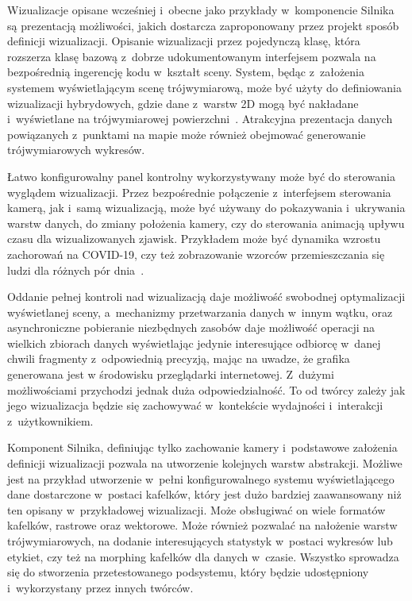 Wizualizacje opisane wcześniej i~obecne jako przykłady w~komponencie Silnika są prezentacją możliwości, jakich dostarcza zaproponowany przez projekt sposób definicji wizualizacji. Opisanie wizualizacji przez pojedynczą klasę, która rozszerza klasę bazową z~dobrze udokumentowanym interfejsem pozwala na bezpośrednią ingerencję kodu w~kształt sceny. System, będąc z~założenia systemem wyświetlającym scenę trójwymiarową, może być użyty do definiowania wizualizacji hybrydowych, gdzie dane z~warstw 2D mogą być nakładane i~wyświetlane na trójwymiarowej powierzchni~\cite{Hybrid}. Atrakcyjna prezentacja danych powiązanych z~punktami na mapie może również obejmować generowanie trójwymiarowych wykresów.

Łatwo konfigurowalny panel kontrolny wykorzystywany może być do sterowania wyglądem wizualizacji. Przez bezpośrednie połączenie z~interfejsem sterowania kamerą, jak i~samą wizualizacją, może być używany do pokazywania i~ukrywania warstw danych, do zmiany położenia kamery, czy do sterowania animacją upływu czasu dla wizualizowanych zjawisk. Przykładem może być dynamika wzrostu zachorowań na COVID-19, czy też zobrazowanie wzorców przemieszczania się ludzi dla różnych pór dnia~\cite{Kwan}.

Oddanie pełnej kontroli nad wizualizacją daje możliwość swobodnej optymalizacji wyświetlanej sceny, a~mechanizmy przetwarzania danych w~innym wątku, oraz asynchroniczne pobieranie niezbędnych zasobów daje możliwość operacji na wielkich zbiorach danych wyświetlając jedynie interesujące odbiorcę w~danej chwili fragmenty z~odpowiednią precyzją, mając na uwadze, że grafika generowana jest w środowisku przeglądarki internetowej. Z~dużymi możliwościami przychodzi jednak duża odpowiedzialność. To od twórcy zależy jak jego wizualizacja będzie się zachowywać w~kontekście wydajności i~interakcji z~użytkownikiem.

Komponent Silnika, definiując tylko zachowanie kamery i~podstawowe założenia definicji wizualizacji pozwala na utworzenie kolejnych warstw abstrakcji. Możliwe jest na przykład utworzenie w~pełni konfigurowalnego systemu wyświetlającego dane dostarczone w~postaci kafelków, który jest dużo bardziej zaawansowany niż ten opisany w~przykładowej wizualizacji. Może obsługiwać on wiele formatów kafelków, rastrowe oraz wektorowe. Może również pozwalać na nałożenie warstw trójwymiarowych, na dodanie interesujących statystyk w~postaci wykresów lub etykiet, czy też na morphing kafelków dla danych w~czasie. Wszystko sprowadza się do stworzenia przetestowanego podsystemu, który będzie udostępniony i~wykorzystany przez innych twórców. 
